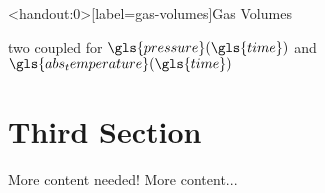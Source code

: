 \documentclass[compress, english]{beamer}%
\begin{document}
\begin{frame}<handout:0>[label=gas-volumes]{Gas Volumes\autocites{eriksson_modeling_2007}[30]{guzzella_introduction_2010}{hendricks_isothermal_2001}{mathworks_constant_2018}}
\centering
\begin{figure}
	\def\svgwidth{0.8\textwidth}
	
\end{figure}
\pause
\textrightarrow{} two coupled  for \(\gls{pressure}(\gls{time})\) and \(\gls{abs_temperature}(\gls{time})\)
\end{frame}
\section{Third Section}
\begin{frame}{More content needed!}
	More content...
\end{frame}
\end{document}
